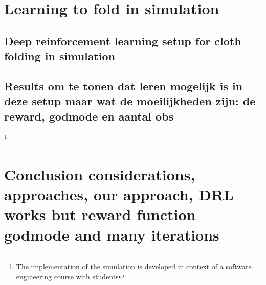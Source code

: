 \documentclass[\home/main.tex]{subfiles}
\begin{document}
\section{Learning to fold in simulation}
\subsection{Deep reinforcement learning setup for cloth folding in simulation}
\subsection{Results \tiny{om te tonen dat leren mogelijk is in deze setup maar wat de moeilijkheden zijn: de reward, godmode en aantal obs}}

\footnote{The implementation of the simulation is developed in context of a software engineering course with students }


\section{Conclusion {\tiny considerations, approaches, our approach, DRL works but reward function godmode and many iterations}}
\end{document}
